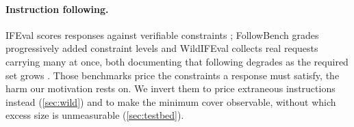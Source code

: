 \paragraph{Instruction following.}
IFEval scores responses against verifiable constraints \citep{zhou2023ifeval}; FollowBench grades
progressively added constraint levels and WildIFEval collects real requests carrying many at once, both
documenting that following degrades as the required set grows
\citep{jiang2024followbench, lior2025wildifeval}. Those benchmarks price the constraints a response must
satisfy, the harm our motivation rests on. We invert them to price extraneous instructions instead
(\autoref{sec:wild}) and to make the minimum cover observable, without which excess size is unmeasurable
(\autoref{sec:testbed}).
